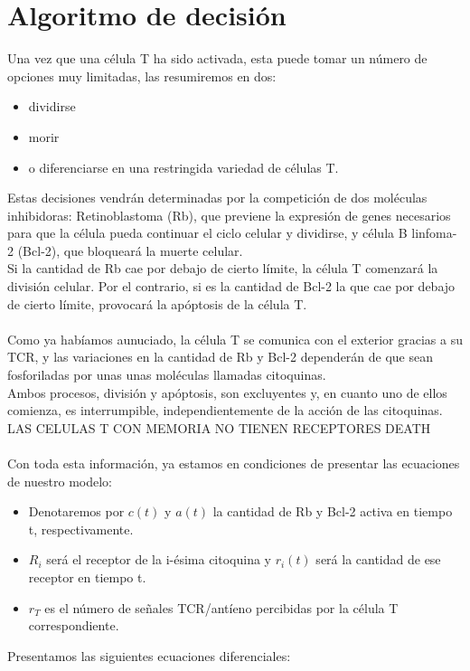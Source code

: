 \documentclass{article}
\begin{document}
	 \section{Algoritmo de decisión}
	 Una vez que una célula T ha sido activada, esta puede tomar un número de opciones muy limitadas, las resumiremos en dos:
	 \begin{itemize}
	 	\item dividirse
	 	\item morir
	 	\item o diferenciarse en una restringida variedad de células T.
	 	\end{itemize}
	 Estas decisiones vendrán determinadas por la competición de dos moléculas inhibidoras: Retinoblastoma (Rb), que previene la expresión de genes necesarios para que la célula pueda continuar el ciclo celular y dividirse, y célula B linfoma-2 (Bcl-2), que bloqueará la muerte celular.
	 \\
	 Si la cantidad de Rb cae por debajo de cierto límite, la célula T comenzará la división celular. Por el contrario, si es la cantidad de Bcl-2 la que  cae por debajo de cierto límite, provocará la apóptosis de la célula T. 
	 \\
	 \\
	 Como ya habíamos aunuciado, la célula T se comunica con el exterior gracias a su TCR, y las variaciones en la cantidad de Rb y Bcl-2 dependerán de que sean fosforiladas por unas unas moléculas llamadas citoquinas.
	\\
	Ambos procesos, división y apóptosis, son excluyentes y, en cuanto uno de ellos comienza, es interrumpible, independientemente de la acción de las citoquinas. LAS CELULAS T CON MEMORIA NO TIENEN RECEPTORES DEATH
	\\
	\\
	Con toda esta información, ya estamos en condiciones de presentar las ecuaciones de nuestro modelo: 
	\begin{itemize}
	    \item Denotaremos por \textit{$c(t)$} y \textit{$a(t)$} la cantidad de Rb y Bcl-2 activa en tiempo t, respectivamente.
	    \item \textit{$R_{i}$} será el receptor de la i-ésima citoquina y \textit{$r_{i}(t)$} será la cantidad de ese receptor en tiempo t. 
	    \item $r_{T}$ es el número de señales TCR/antíeno  percibidas por la célula T correspondiente.
	\end{itemize} 
	 Presentamos las siguientes ecuaciones diferenciales:
	 
\end{document}
